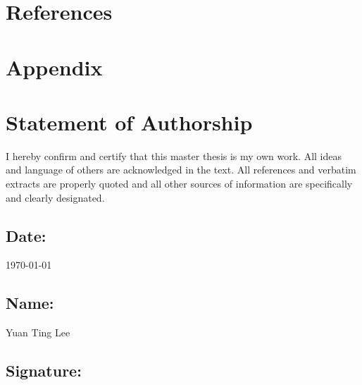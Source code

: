 \documentclass[12pt,onecolumn,twoside]{layout}
\begin{document}
\showacknow{} %
\clearpage
\section*{References}


\clearpage

\appendix
\section{Appendix}

\clearpage
\section{Statement of Authorship}
I hereby confirm and certify that this master thesis is my own work. All ideas and language of others are acknowledged in the text. All references and verbatim extracts are properly quoted and all other sources of information are specifically and clearly designated. 

\subsection*{Date:} \today


\subsection*{Name:} Yuan Ting Lee


\subsection*{Signature:}
\end{document}
